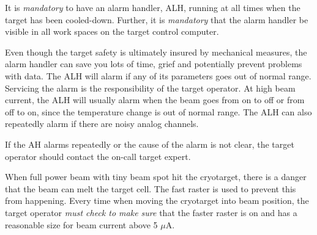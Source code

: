 \begin{safetyen}{0}{0} 
It is \emph{mandatory} to have an alarm
handler, ALH, running at all times when the target has been cooled-down.
Further, it is \emph{mandatory} that the alarm handler be visible
in all work spaces on the target control computer. \end{safetyen}
Even though the target safety is ultimately insured by mechanical
measures, the alarm handler can save you lots of time, grief and potentially
prevent problems with data. The ALH will alarm if any of its parameters
goes out of normal range. Servicing the alarm is the responsibility
of the target operator. At high beam current, the ALH will usually
alarm when the beam goes from on to off or from off to on, since the
temperature change is out of normal range. The ALH can also repeatedly
alarm if there are noisy analog channels. \begin{safetyen}{0}{0}
If the AH alarms repeatedly or the cause of the alarm is not clear,
the target operator should contact the on-call target expert. 
\end{safetyen}


\begin{safetyen}{0}{0} 
When full power beam with tiny beam spot
hit the cryotarget, there is a danger that the beam can melt the target
cell. The fast raster is used to prevent this from happening. Every
time when moving the cryotarget into beam position, the target operator
\emph{must check to make sure} that the faster raster is on and has
a reasonable size for beam current above 5 $\mu$A. 
\end{safetyen}

